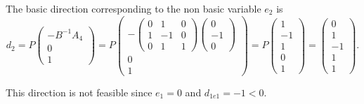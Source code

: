 \begin{enumerate}
\begin{enumerate}
 
 The basic direction corresponding to the non basic variable $e_2$ is 
$$d_2 = P \begin{pmatrix} 
-B^{-1} A_4\\ 
0\\
1
 \end{pmatrix} 
= P \begin{pmatrix} 
-\begin{pmatrix} 
0 & 1  &0\\
1  & -1 & 0 \\
0 & 1 & 1 
\end{pmatrix} 
 \begin{pmatrix}
0\\
-1 \\
0
\end{pmatrix} \\ 
0 \\
1 
\end{pmatrix} 
= P \begin{pmatrix}
1\\
-1\\
1 \\ 
 0\\
 1
 \end{pmatrix} = 
  \begin{pmatrix}
 0\\
1\\
-1\\ 
 1\\
 1
 \end{pmatrix}.
 $$
  
This direction is not feasible since $e_1 = 0$ and $d_{1 e1} = - 1 <0$.

\end{enumerate}


\end{enumerate}


